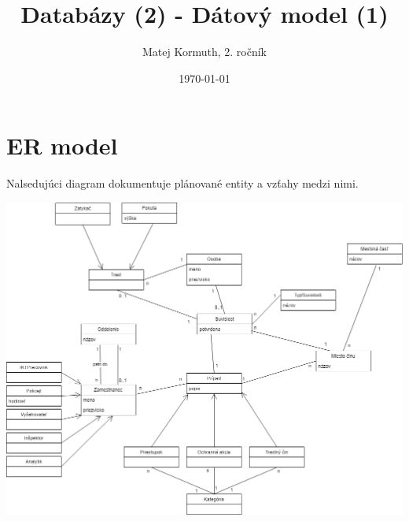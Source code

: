 \documentclass[11pt,a4paper]{article}
\begin{document}
    \title{Databázy (2) - Dátový model (1)}
    \author{Matej Kormuth, 2. ročník}
    \date{\today}

    \begin{titlingpage}
        \renewcommand\maketitlehooka{\null\mbox{}\vfill}
        \renewcommand\maketitlehookd{\vfill\null}
        \maketitle
    \end{titlingpage}

    \section*{ER model}

    Nalsedujúci diagram dokumentuje plánované entity a vzťahy medzi nimi.

    \begin{center}
        \includegraphics[width=\textwidth]{./model1.png}
    \end{center}
\end{document}
